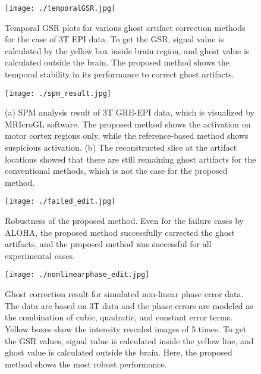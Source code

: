 \documentclass[num-refs]{wiley-article}
\newcommand{\0}{{\boldsymbol{0}}}
\newcommand{\1}{\blmath{1}}
\begin{document}
	\begin{figure}[h]
		\centering
		\texttt{[image: ./temporalGSR.jpg]}
		\caption{
			Temporal GSR plots for various ghost artifact correction methods for the case of 3T EPI data. To get the GSR, signal value is calculated by the yellow box inside brain region, and ghost value is calculated outside the brain. The proposed method shows the temporal stability in its performance to correct ghost artifacts.}
		\label{fig:temporalGSR}
	\end{figure}
	
	\begin{figure}[h]
		\centering
		\texttt{[image: ./spm\_result.jpg]}
		\caption{
			(a) SPM analysis result of 3T GRE-EPI data, which is visualized by MRIcroGL software. The proposed method shows the activation on motor cortex regions only, while the reference-based method shows suspicious activation. (b) The reconstructed slice at the artifact locations showed that there are still remaining	ghost artifacts for the conventional methods, which is not the case for the	proposed method. }
		\label{fig:spm_result}
	\end{figure}
	
	\begin{figure}[h]
		\centering
		\texttt{[image: ./failed\_edit.jpg]}
		\caption{Robustness of the proposed method. Even for the failure cases by ALOHA, the proposed method successfully corrected the ghost artifacts, and the proposed method was successful for all experimental cases.}
		\label{fig:failed_edit}
	\end{figure}
	
	\begin{figure}[h]
		\centering
		\texttt{[image: ./nonlinearphase\_edit.jpg]}
		\caption{Ghost correction result for simulated non-linear phase error data. The data are based on 3T data and 
			the phase errors are modeled as the combination of cubic, quadratic, and constant error terms. Yellow boxes show the intensity rescaled images of 5 times. To get the GSR values, signal value is calculated inside the yellow line, and ghost value is calculated outside the brain. Here, the proposed method shows the most robust performance.
		}
		\label{fig:nonlinearphase}
	\end{figure}
	
	\clearpage
	
\end{document}
